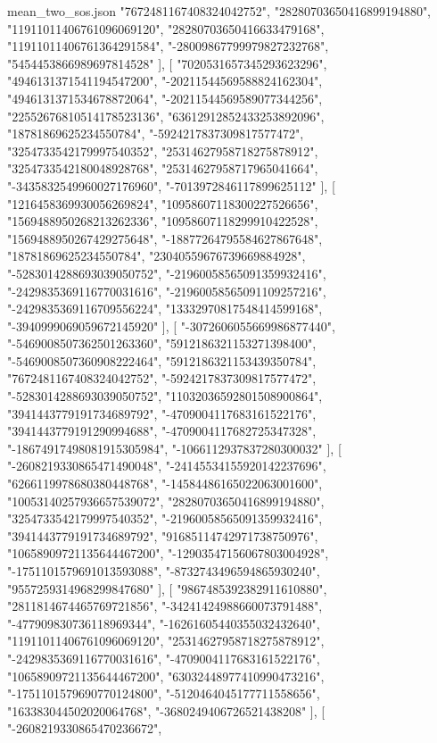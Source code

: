 \begin{filecontents*}[overwrite]{mean_two_sos.json}
    "7672481167408324042752",
    "28280703650416899194880",
    "11911011406761096069120",
    "28280703650416633479168",
    "11911011406761364291584",
    "-28009867799979827232768",
    "5454453866989697814528"
   ],
   [
    "7020531657345293623296",
    "4946131371541194547200",
    "-20211544569588824162304",
    "4946131371534678872064",
    "-20211544569589077344256",
    "22552676810514178523136",
    "63612912852433253892096",
    "18781869625234550784",
    "-5924217837309817577472",
    "3254733542179997540352",
    "25314627958718275878912",
    "3254733542180048928768",
    "25314627958717965041664",
    "-3435832549960027176960",
    "-7013972846117899625112"
   ],
   [
    "1216458369930056269824",
    "10958607118300227526656",
    "1569488950268213262336",
    "10958607118299910422528",
    "1569488950267429275648",
    "-18877264795584627867648",
    "18781869625234550784",
    "23040559676739669884928",
    "-5283014288693039050752",
    "-21960058565091359932416",
    "-2429835369116770031616",
    "-21960058565091109257216",
    "-2429835369116709556224",
    "13332970817548414599168",
    "-3940999069059672145920"
   ],
   [
    "-3072606055669986877440",
    "-5469008507362501263360",
    "5912186321153271398400",
    "-5469008507360908222464",
    "5912186321153439350784",
    "7672481167408324042752",
    "-5924217837309817577472",
    "-5283014288693039050752",
    "11032036592801508900864",
    "3941443779191734689792",
    "-4709004117683161522176",
    "3941443779191290994688",
    "-4709004117682725347328",
    "-18674917498081915305984",
    "-1066112937837280300032"
   ],
   [
    "-2608219330865471490048",
    "-24145534155920142237696",
    "6266119978680380448768",
    "-14584486165022063001600",
    "10053140257936657539072",
    "28280703650416899194880",
    "3254733542179997540352",
    "-21960058565091359932416",
    "3941443779191734689792",
    "91685114742971738750976",
    "10658909721135644467200",
    "-12903547156067803004928",
    "-1751101579691013593088",
    "-8732743496594865930240",
    "9557259314968299847680"
   ],
   [
    "9867485392382911610880",
    "2811814674465769721856",
    "-34241424988660073791488",
    "-477909830736118969344",
    "-16261605440355032432640",
    "11911011406761096069120",
    "25314627958718275878912",
    "-2429835369116770031616",
    "-4709004117683161522176",
    "10658909721135644467200",
    "63032448977410990473216",
    "-1751101579690770124800",
    "-5120464045177711558656",
    "163383044502020064768",
    "-3680249406726521438208"
   ],
   [
    "-2608219330865470236672",

\end{filecontents*}
